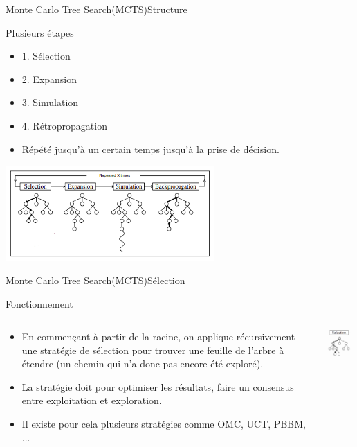 \begin{frame}{Monte Carlo Tree Search(MCTS)}{Structure}
    \begin{block}{Plusieurs étapes}
	    	\begin{itemize}
	    		\item 1. Sélection
	    		\item 2. Expansion
	    		\item 3. Simulation
	    		\item 4. Rétropropagation
	    		\item Répété jusqu'à un certain temps jusqu'à la prise de décision.
	    	\end{itemize}
		\begin{center}
			\includegraphics[width=8cm]{ressources/MCTSEtapes}
		\end{center}
	\end{block}
\end{frame}

\begin{frame}{Monte Carlo Tree Search(MCTS)}{Sélection}
\begin{block}{Fonctionnement}
	\begin{columns}
		\begin{column}{7cm}
			\begin{itemize}
				\item En commençant à partir de la racine, on applique récursivement une stratégie de sélection pour trouver une feuille de l'arbre à étendre (un chemin qui n'a donc pas encore été exploré).
				\item La stratégie doit pour optimiser les résultats, faire un consensus entre exploitation et exploration.
				\item Il existe pour cela plusieurs stratégies comme OMC, UCT, PBBM, ...
			\end{itemize}
		\end{column}
		\begin{column}{4cm}
			\includegraphics[width=3cm]{ressources/Selection.png}
		\end{column}
	\end{columns}
\end{block}
\end{frame}

